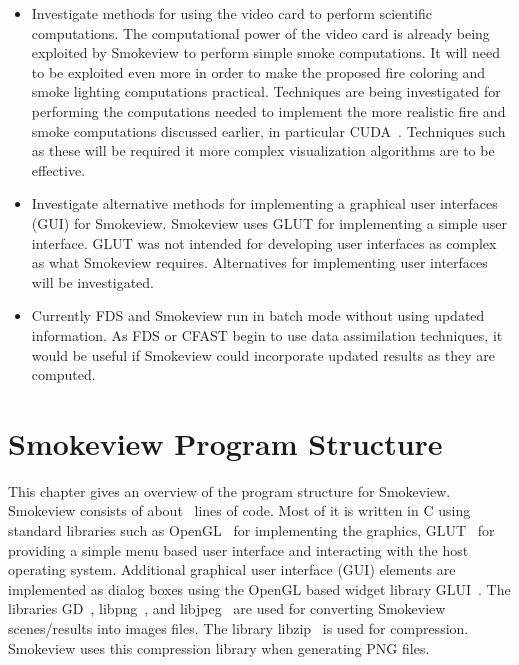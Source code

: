 \documentclass[11pt,twoside]{book}
\begin{document}
\begin{itemize}

\item Investigate methods for using the video card to perform
scientific computations. The computational power of the video card
is already  being exploited by Smokeview to perform simple smoke
computations. It will need to be exploited even more in order to
make the proposed fire coloring and smoke lighting computations
practical. Techniques are being investigated for performing the
computations needed to implement the more realistic fire and smoke
computations discussed earlier, in particular CUDA~\cite{CUDA}.
Techniques such as these will be required it more complex
visualization algorithms are to be effective.

\item Investigate alternative methods for implementing a graphical
user interfaces (GUI) for Smokeview. Smokeview uses GLUT for
implementing a simple user interface.  GLUT was not intended for
developing user interfaces as complex as what Smokeview requires.
Alternatives for implementing user interfaces will be
investigated.

\item Currently FDS and Smokeview run in batch mode without using
updated information. As FDS or CFAST begin to use data
assimilation techniques, it would be useful if Smokeview could
incorporate updated results as they are computed.

\end{itemize}

%
%

\printbibliography[heading=bibintoc,title={References}]

%
%

\appendix
{}


%
%

\chapter{Smokeview Program Structure}
\label{smvprogstruct}

This chapter gives an overview of the program structure for
Smokeview. Smokeview consists of about \smvlines\ lines of code.
Most of it is written in C using standard libraries such as
OpenGL~\cite{OpenGLRed} for implementing the graphics,
GLUT~\cite{OpenGLGlut} for providing a simple menu based user
interface and interacting with the host operating system.
Additional graphical user interface (GUI) elements are implemented
as dialog boxes using the OpenGL based widget library
GLUI~\cite{GLUILIB}. The libraries GD~\cite{GDLIB},
libpng~\cite{PNGLIB}, and libjpeg~\cite{JPEGLIB} are used for
converting Smokeview scenes/results into images files. The library
libzip~\cite{ZLIB} is used for compression. Smokeview uses this
compression library when generating PNG files.
\end{document}
